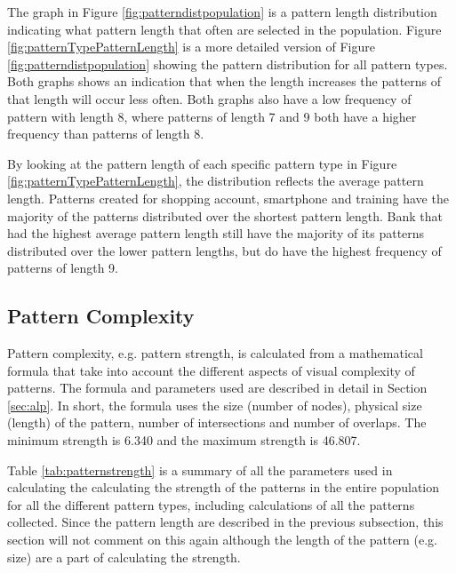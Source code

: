     \clearpage

    The graph in Figure \ref{fig:patterndistpopulation} is a pattern length distribution indicating what pattern length that often are selected in the population. Figure \ref{fig:patternTypePatternLength} is a more detailed version of Figure \ref{fig:patterndistpopulation} showing the pattern distribution for all pattern types. Both graphs shows an indication that when the length increases the patterns of that length will occur less often. Both graphs also have a low frequency of pattern with length 8, where patterns of length 7 and 9 both have a higher frequency than patterns of length 8.

    By looking at the pattern length of each specific pattern type in Figure \ref{fig:patternTypePatternLength}, the distribution reflects the average pattern length. Patterns created for shopping account, smartphone and training have the majority of the patterns distributed over the shortest pattern length. Bank that had the highest average pattern length still have the majority of its patterns distributed over the lower pattern lengths, but do have the highest frequency of patterns of length 9. 


	\subsection{Pattern Complexity}

    Pattern complexity, e.g. pattern strength, is calculated from a mathematical formula that take into account the different aspects of visual complexity of patterns. The formula and parameters used are described in detail in Section \ref{sec:alp}. In short, the formula uses the size (number of nodes), physical size (length) of the pattern, number of intersections and number of overlaps. The minimum strength is 6.340 and the maximum strength is 46.807.

    Table \ref{tab:patternstrength} is a summary of all the parameters used in calculating the calculating the strength of the patterns in the entire population for all the different pattern types, including calculations of all the patterns collected. Since the pattern length are described in the previous subsection, this section will not comment on this again although the length of the pattern (e.g. size) are a part of calculating the strength. 

